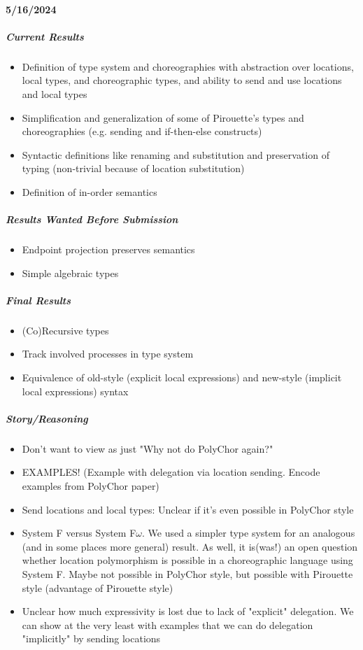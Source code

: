 \documentclass{article}
\theoremstyle{definition}
\begin{document}
\paragraph{5/16/2024}
\subparagraph{Current Results}
\begin{itemize}
	\item Definition of type system and choreographies with abstraction over locations, local types, and choreographic types, and ability to send and use locations and local types
	\item Simplification and generalization of some of Pirouette's types and choreographies (e.g. sending and if-then-else constructs)
	\item Syntactic definitions like renaming and substitution and preservation of typing (non-trivial because of location substitution)
	\item Definition of in-order semantics
\end{itemize}
\subparagraph{Results Wanted Before Submission}
\begin{itemize}
	\item Endpoint projection preserves semantics
	\item Simple algebraic types
\end{itemize}
\subparagraph{Final Results}
\begin{itemize}
	\item (Co)Recursive types
	\item Track involved processes in type system
	\item Equivalence of old-style (explicit local expressions) and new-style (implicit local expressions) syntax
\end{itemize}

\subparagraph{Story/Reasoning}
\begin{itemize}
	\item Don't want to view as just "Why not do PolyChor again?"
	\item EXAMPLES! (Example with delegation via location sending. Encode examples from PolyChor paper)
	\item Send locations and local types: Unclear if it's even possible in PolyChor style
	\item System F versus System F$\omega$. We used a simpler type system for an analogous (and in some places more general) result. As well, it is(was!) an open question whether location polymorphism is possible in a choreographic language using System F. Maybe not possible in PolyChor style, but possible with Pirouette style (advantage of Pirouette style)
	\item Unclear how much expressivity is lost due to lack of "explicit" delegation. We can show at the very least with examples that we can do delegation "implicitly" by sending locations
\end{itemize}
\end{document}
